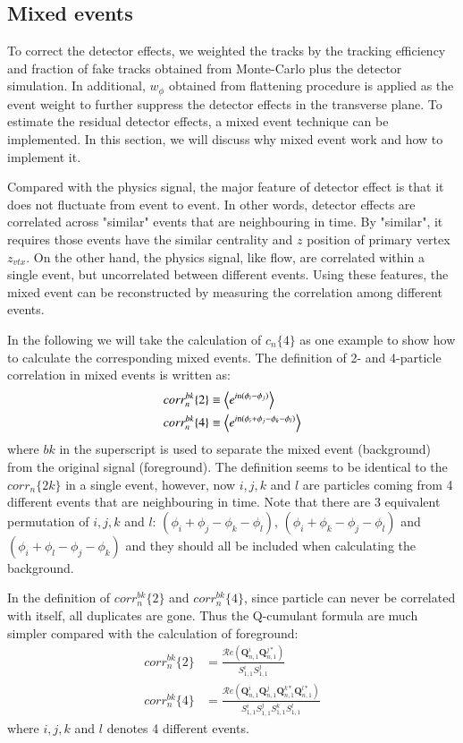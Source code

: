 \subsection{Mixed events}
To correct the detector effects, we weighted the tracks by the tracking efficiency and fraction of fake tracks obtained from Monte-Carlo plus the detector simulation. In additional, $w_\phi$ obtained from flattening procedure is applied as the event weight to further suppress the detector effects in the transverse plane. To estimate the residual detector effects, a mixed event technique can be implemented. In this section, we will discuss why mixed event work and how to implement it.

Compared with the physics signal, the major feature of detector effect is that it does not fluctuate from event to event. In other words, detector effects are correlated across "similar" events that are neighbouring in time. By "similar", it requires those events have the similar centrality and $z$ position of primary vertex $z_{vtx}$. On the other hand, the physics signal, like flow, are correlated within a single event, but uncorrelated between different events. Using these features, the mixed event can be reconstructed by measuring the correlation among different events.

In the following we will take the calculation of $c_{n}\{4\}$ as one example to show how to calculate the corresponding mixed events. The definition of 2- and 4-particle correlation in mixed events is written as:
\begin{equation}
\begin{split}
corr_{n}^{bk}\{2\}&\equiv \left\langle e^{i\text{n}(\phi_i-\phi_j)}\right\rangle \\
corr_{n}^{bk}\{4\}&\equiv \left\langle e^{i\text{n}(\phi_i+\phi_j-\phi_k-\phi_l)}\right\rangle
\end{split}
\end{equation}
where $bk$ in the superscript is used to separate the mixed event (background) from the original signal (foreground). The definition seems to be identical to the $corr_{n}\{2k\}$ in a single event, however, now $i, j, k$ and $l$ are particles coming from 4 different events that are neighbouring in time. Note that there are 3 equivalent permutation of $i, j, k$ and $l$: $(\phi_i+\phi_j-\phi_k-\phi_l)$, $(\phi_i+\phi_k-\phi_j-\phi_l)$ and $(\phi_i+\phi_l-\phi_j-\phi_k)$ and they should all be included when calculating the background.

In the definition of $corr_{n}^{bk}\{2\}$ and $corr_{n}^{bk}\{4\}$, since particle can never be correlated with itself, all duplicates are gone. Thus the Q-cumulant formula are much simpler compared with the calculation of foreground:
\begin{equation}
\begin{split}
corr_n^{bk}\{2\}&=\frac{\mathcal{R}\textit{e}(\pmb{Q}_{n,1}^{i}\pmb{Q}_{n,1}^{j*})}{S_{1,1}^i S_{1,1}^j} \\
corr_n^{bk}\{4\}&=\frac{\mathcal{R}\textit{e}(\pmb{Q}_{n,1}^{i}\pmb{Q}_{n,1}^{j}\pmb{Q}_{n,1}^{k*}\pmb{Q}_{n,1}^{l*})}{S_{1,1}^i S_{1,1}^j S_{1,1}^k S_{1,1}^l}
\end{split}
\end{equation}
where $i, j, k$ and $l$ denotes 4 different events.

